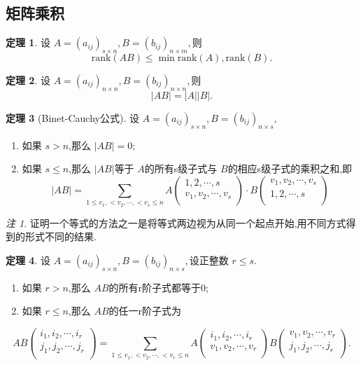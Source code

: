 \documentclass[a4paper,11pt]{article}%
\theoremstyle{remark}
\newtheorem*{remark}{注}
\theoremstyle{definition}
\newtheorem{theorem}{定理}[section]
\theoremstyle{definition}
\theoremstyle{plain}
\newcommand*{\abs}[1]{\lvert #1 \rvert}
\begin{document}
\subsection{矩阵乘积}
\begin{theorem}
    设 $A=(a _{ij})_{s\times n},B=(b _{ij})_{n\times m},$则
    \[\text{rank}(AB)\leq \min{\text{rank}(A),\text{rank}(B)}.\]
\end{theorem}
\begin{theorem}
    设 $A=(a _{ij})_{n\times n},B=(b _{ij})_{n\times n},$则
    \[\abs{AB}=\abs{A}\abs{B}.\]
\end{theorem}
\begin{theorem}[Binet-Cauchy公式]
   设 $A=(a _{ij})_{s\times n},B=(b _{ij})_{n\times s},$ 
   \begin{enumerate}
    \item 如果 $s>n$,那么 $\abs{AB}=0;$
    \item 如果 $s\leq n$,那么 $\abs{AB}$等于 $A$的所有s级子式与 $B$的相应s级子式的乘积之和,即
    \[\abs{AB}=\sum_{1 \leq v_1,<v_2,\cdots,<v_s\leq n}{
        A
        \begin{pmatrix}
        1,2,\cdots,s\\
        v_1,v_2,\cdots,v_s\\
        \end{pmatrix}
        \cdot
        B
        \begin{pmatrix}
            v_1,v_2,\cdots,v_s\\
            1,2,\cdots,s\\
        \end{pmatrix}
    }\]
   \end{enumerate}
\end{theorem}
\begin{remark}
    证明一个等式的方法之一是将等式两边视为从同一个起点开始,用不同方式得到的形式不同的结果.
\end{remark}
\begin{theorem}
    设 $A=(a _{ij})_{s\times n},B=(b _{ij})_{n\times s},$设正整数 $r\leq s$.
    \begin{enumerate}
        \item 如果 $r>n$,那么 $AB$的所有r阶子式都等于0;
        \item 如果 $r\leq n$,那么 $AB$的任一r阶子式为
    \end{enumerate}
        \[AB
        \begin{pmatrix}
            i_1,i_2,\cdots,i_r\\
            j_1,j_2,\cdots,j_r\\
        \end{pmatrix}
        =
        \sum_{1\leq v_1,<v_2,\cdots,<v_r\leq n}
        A
        \begin{pmatrix}
            i_1,i_2,\cdots,i_r\\
            v_1,v_2,\cdots,v_r\\
        \end{pmatrix}
        B
        \begin{pmatrix}
            v_1,v_2,\cdots,v_r\\
            j_1,j_2,\cdots,j_r\\
        \end{pmatrix}
        .
        \]
\end{theorem}
\end{document}
